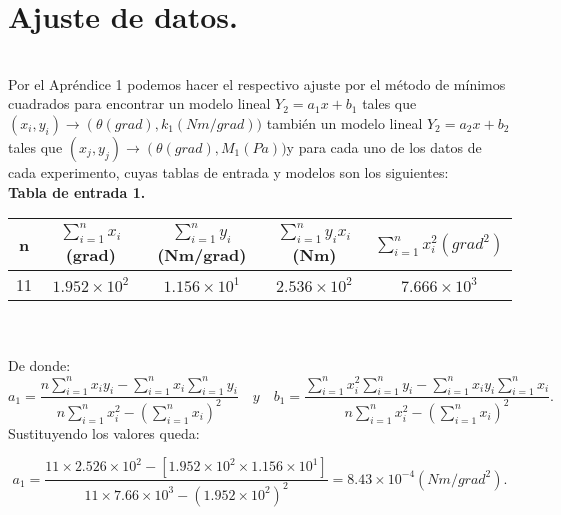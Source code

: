 \documentclass[10pt,a4paper]{article}
\begin{document}
\section*{Ajuste de datos.}\\
Por el Apr\'{e}ndice 1 podemos hacer el respectivo ajuste por el m\'{e}todo de m\'{i}nimos cuadrados para encontrar un modelo lineal ${Y}_{2}={a}_{1}x +{b}_{1}$ tales que $\left( { x }_{ i },{ y }_{ i } \right) \rightarrow \left( \theta(grad),{k}_{1} (Nm/grad))$  tambi\'{e}n un modelo lineal ${Y}_{2}={a}_{2}x +{b}_{2}$ tales que $\left( { x }_{ j },{ y }_{ j } \right) \rightarrow \left( \theta(grad), {M}_{1}(Pa))$y para cada uno de los datos de cada experimento, cuyas tablas de entrada y modelos son los siguientes:
\medskip
\\
\textbf{Tabla de entrada 1.}
\\
\begin{figure 6}
\centering
\begin{tabular}{|c|c|c|c|c|}
\hline 
n&$\sum _{ i=1 }^{ n }{ { x }_{ i } } $(grad) & $\sum _{ i=1 }^{ n }{ { y }_{ i } }$(Nm/grad) & $ \sum _{ i=1 }^{ n }{ { y }_{ i } } { x }_{ i }$ (Nm) & $\sum _{ i=1 }^{ n }{ { x }_{ i }^{ 2 } }({ grad }^{ 2 })$ \\ 

\hline 
11&$1.952\times { 10 }^{ 2 }$& $1.156\times { 10 }^{ 1 }$ & $2.536\times { 10 }^{ 2 }$ & $7.666\times { 10 }^{ 3 }$\\ 
\hline 
\end{tabular}
\end{figure 6} 
\\
\\
De donde:
\[{a}_{1}=\frac { n\sum _{ i=1 }^{ n }{ { x }_{ i }{ y }_{ i } } -\sum _{ i=1 }^{ n }{ { x }_{ i } } \sum _{ i=1 }^{ n }{ { y }_{ i } }  }{ n\sum _{ i=1 }^{ n }{ { x }_{ i }^{ 2 } } -{ \left( \sum _{ i=1 }^{ n }{ { x }_{ i } }  \right)  }^{ 2 } } \quad y\quad {b}_{1}=\frac { \sum _{ i=1 }^{ n }{ { x }_{ i }^{ 2 } } \sum _{ i=1 }^{ n }{ { y }_{ i } } -\sum _{ i=1 }^{ n }{ { x }_{ i }{ y }_{ i } } \sum _{ i=1 }^{ n }{ { x }_{ i } }  }{ n\sum _{ i=1 }^{ n }{ { x }_{ i }^{ 2 } } -{ \left( \sum _{ i=1 }^{ n }{ { x }_{ i } }  \right)  }^{ 2 } }.\]
Sustituyendo los valores queda:

\[{a}_{1}=\frac { 11\times 2.526\times { 10 }^{ 2 }-\left[ 1.952\times { 10 }^{ 2 }\times 1.156\times { 10 }^{ 1 } \right]  }{ 11\times 7.66\times { 10 }^{ 3 }-{ \left( 1.952\times { 10 }^{ 2 }\right)  }^{ 2 } } ={ 8.43\times 10 }^{ -4 } (Nm/{grad}^{ 2 }).\]
\end{document}
